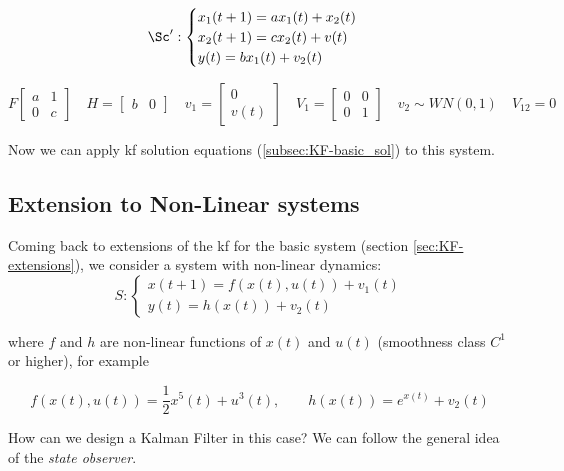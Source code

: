 \begin{rem}
    \[
        \Sc':
        \begin{cases}
            x_1(t+1) = ax_1(t) + x_2(t) \\
            x_2(t+1) = cx_2(t) + v(t) \\
            y(t) = bx_1(t) + v_2(t)
        \end{cases}
    \]

    \[
        F\begin{bmatrix}
            a & 1 \\
            0 & c
        \end{bmatrix}
        \quad H = \begin{bmatrix}
            b & 0
        \end{bmatrix}
        \quad v_1 = \begin{bmatrix}
            0 \\ v(t)
        \end{bmatrix}
        \quad V_1 = \begin{bmatrix}
            0 & 0 \\
            0 & 1
        \end{bmatrix}
        \quad v_2 \sim WN(0,1)
        \quad V_{12} = 0
    \]

    Now we can apply \gls{kf} solution equations (\ref{subsec:KF-basic_sol}) to this system.
\end{rem}

\subsection{Extension to Non-Linear systems}\label{subsec:KF_non-lin_ext}
Coming back to extensions of the \gls{kf} for the basic system (section \ref{sec:KF-extensions}), we consider a system with non-linear dynamics:
\[
    S: \begin{cases}
        x(t+1) = f(x(t), u(t)) + v_1(t) \\
        y(t) = h(x(t)) + v_2(t)
    \end{cases}
\]

where $f$ and $h$ are non-linear functions of $x(t)$ and $u(t)$ (smoothness class $C^1$ or higher), for example

\vspace{-15pt}

\[
    f(x(t), u(t)) = \frac{1}{2} x^5(t) + u^3(t)  , \qquad h(x(t)) = e^{x(t)} + v_2(t)
\]

How can we design a Kalman Filter in this case? We can follow the general idea of the \emph{state observer}. 

